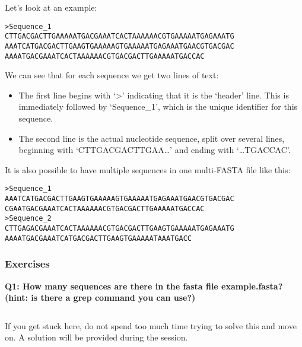 \documentclass[11pt]{article}
\makeatletter
\providecommand{\tightlist}{%
      \setlength{\itemsep}{0pt}\setlength{\parskip}{0pt}}
\newcommand{\boxspacing}{\kern\kvtcb@left@rule\kern\kvtcb@boxsep}
\newcommand{\prompt}[4]{
        {\ttfamily\llap{{\color{blue}\LARGE\faKeyboardO\hspace{3pt}#4}}\vspace{-\baselineskip}}
    }
\makeatother
\begin{document}
Let's look at an example:

\begin{verbatim}
>Sequence_1
CTTGACGACTTGAAAAATGACGAAATCACTAAAAAACGTGAAAAATGAGAAATG
AAATCATGACGACTTGAAGTGAAAAAGTGAAAAATGAGAAATGAACGTGACGAC
AAAATGACGAAATCACTAAAAAACGTGACGACTTGAAAAATGACCAC
\end{verbatim}

We can see that for each sequence we get two lines of text:

\begin{itemize}
\tightlist
\item
  The first line begins with `\textgreater{}' indicating that it is the
  `header' line. This is immediately followed by `Sequence\_1', which is
  the unique identifier for this sequence.
\item
  The second line is the actual nucleotide sequence, split over several
  lines, beginning with `CTTGACGACTTGAA\ldots{}' and ending with
  `\ldots TGACCAC'.
\end{itemize}

It is also possible to have multiple sequences in one multi-FASTA file
like this:

\begin{verbatim}
>Sequence_1
AAATCATGACGACTTGAAGTGAAAAAGTGAAAAATGAGAAATGAACGTGACGAC
CGAATGACGAAATCACTAAAAAACGTGACGACTTGAAAAATGACCAC
>Sequence_2
CTTGAGACGAAATCACTAAAAAACGTGACGACTTGAAGTGAAAAATGAGAAATG
AAAATGACGAAATCATGACGACTTGAAGTGAAAAATAAATGACC
\end{verbatim}

\hypertarget{exercises}{%
\subsubsection{Exercises}\label{exercises}}

\textbf{Q1: How many sequences are there in the fasta file
example.fasta? (hint: is there a grep command you can use?)}

    \begin{tcolorbox}[breakable, size=fbox, boxrule=1pt, pad at break*=1mm,colback=cellbackground, colframe=cellborder]
\prompt{In}{incolor}{ }{\boxspacing}
\begin{Verbatim}[commandchars=\\\{\}]

\end{Verbatim}
\end{tcolorbox}

    If you get stuck here, do not spend too much time trying to solve this
and move on. A solution will be provided during the session.
\end{document}
